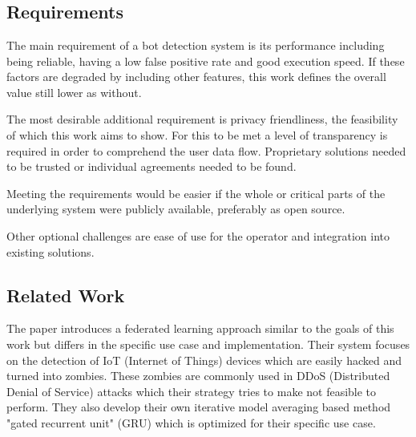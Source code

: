 \documentclass[
    fontsize=12pt,
    headings=small,
    parskip=half,           %
    bibliography=totoc,
    numbers=noenddot,       %
    open=any,               %
    final                   %
]{scrreprt}
\begin{document}
\chapter{}


\section{Requirements}

The main requirement of a bot detection system is its performance including being reliable, having a low false positive rate and good execution speed. If these factors are degraded by including other features, this work defines the overall value still lower as without.

The most desirable additional requirement is privacy friendliness, the feasibility of which this work aims to show. For this to be met a level of transparency is required in order to comprehend the user data flow. Proprietary solutions needed to be trusted or individual agreements needed to be found.

Meeting the requirements would be easier if the whole or critical parts of the underlying system were publicly available, preferably as open source.

Other optional challenges are ease of use for the operator and integration into existing solutions.\todo


\section{Related Work}

The paper \cite{LiJi2021} introduces a federated learning approach similar to the goals of this work but differs in the specific use case and implementation. Their system focuses on the detection of IoT (Internet of Things) devices which are easily hacked and turned into zombies. These zombies are commonly used in DDoS (Distributed Denial of Service) attacks which their strategy tries to make not feasible to perform. They also develop their own iterative model averaging based method "gated recurrent unit" (GRU) which is optimized for their specific use case.
\end{document}
